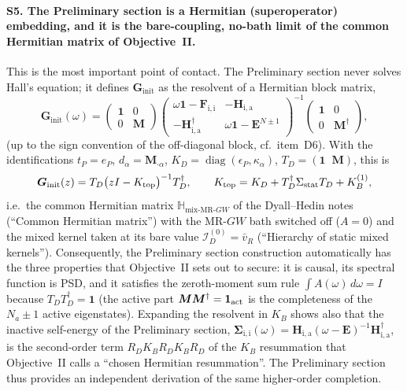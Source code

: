 \documentclass[11pt,a4paper]{article}
\newcommand{\bG}{\boldsymbol{G}}
\newcommand{\bSigma}{\boldsymbol{\Sigma}}
\newcommand{\bH}{\boldsymbol{H}}
\newcommand{\bM}{\boldsymbol{M}}
\newcommand{\bE}{\boldsymbol{E}}
\newcommand{\bF}{\boldsymbol{F}}
\newcommand{\bbH}{\mathbb{H}}
\newcommand{\MRGW}{MR-$GW$}
\newcommand{\Pre}{Preliminary section}
\newcommand{\DHN}{Dyall--Hedin notes}
\begin{document}
\paragraph{S5. The \Pre{} is a Hermitian (superoperator) embedding, and it is
the bare-coupling, no-bath limit of the common Hermitian matrix of
Objective~II.}
This is the most important point of contact.  The \Pre{} never solves Hall's
equation; it defines $\bG_{\text{init}}$ as the resolvent of a Hermitian block
matrix,
\begin{equation}
  \bG_{\text{init}}(\omega)
  =
  \begin{pmatrix}\mathbf 1&0\\0&\bM\end{pmatrix}
  \begin{pmatrix}
    \omega\mathbf 1-\bF_{\mathrm{i,i}} & -\bH_{\mathrm{i,a}}\\
    -\bH_{\mathrm{i,a}}^\dagger & \omega\mathbf 1-\bE^{N\pm1}
  \end{pmatrix}^{-1}
  \begin{pmatrix}\mathbf 1&0\\0&\bM^\dagger\end{pmatrix},
  \label{eq:pre-Ginit}
\end{equation}
(up to the sign convention of the off-diagonal block, cf.\ item~D6).  With the
identifications $t_P=e_P$, $d_\alpha=\bM_{\cdot\alpha}$, $K_D=\operatorname{diag}(\epsilon_P,\kappa_\alpha)$,
$T_D=(\mathbf 1\;\;\bM)$, this is
\begin{equation}
  \bG_{\text{init}}(z)
  =
  T_D\bigl(zI-K_{\rm top}\bigr)^{-1}T_D^\dagger ,
  \qquad
  K_{\rm top}=K_D+T_D^\dagger\Sigma_{\rm stat}T_D+K_B^{(1)},
  \label{eq:pre-as-Ktop}
\end{equation}
i.e.\ the common Hermitian matrix $\bbH_{\text{mix-MR-}GW}$ of the \DHN{}
(``Common Hermitian matrix'') with the \MRGW{} bath switched off ($A=0$) and
the mixed kernel taken at its bare value $\mathcal I_D^{(0)}=\bar v_R$
(``Hierarchy of static mixed kernels'').  Consequently, the \Pre{} construction
automatically has the three properties that Objective~II sets out to secure:
it is causal, its spectral function is PSD, and it satisfies the zeroth-moment
sum rule $\int A(\omega)\,d\omega=I$ because $T_DT_D^\dagger=\mathbf 1$ (the
active part $\bM\bM^\dagger=\mathbf 1_{\rm act}$ is the completeness of the
$N_a\pm1$ active eigenstates).  Expanding the resolvent in $K_B$ shows also
that the inactive self-energy of the \Pre{},
$\bSigma_{\mathrm{i,i}}(\omega)=\bH_{\mathrm{i,a}}(\omega-\bE)^{-1}\bH_{\mathrm{i,a}}^\dagger$,
is the second-order term $R_DK_BR_DK_BR_D$ of the $K_B$ resummation that
Objective~II calls a ``chosen Hermitian resummation''.  The \Pre{} thus
provides an independent derivation of the same higher-order completion.
\end{document}
